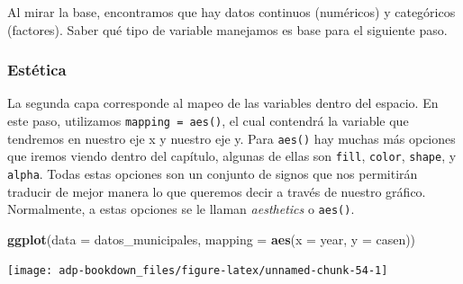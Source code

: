 \documentclass[]{book}
\newenvironment{Shaded}{\begin{snugshade}}{\end{snugshade}}
\newcommand{\CommentTok}[1]{\textcolor[rgb]{0.56,0.35,0.01}{\textit{#1}}}
\newcommand{\DataTypeTok}[1]{\textcolor[rgb]{0.13,0.29,0.53}{#1}}
\newcommand{\KeywordTok}[1]{\textcolor[rgb]{0.13,0.29,0.53}{\textbf{#1}}}
\newcommand{\NormalTok}[1]{#1}
\begin{document}
\begin{Shaded}
\end{Shaded}

Al mirar la base, encontramos que hay datos continuos (numéricos) y
categóricos (factores). Saber qué tipo de variable manejamos es base
para el siguiente paso.

\hypertarget{estetica}{%
\subsubsection{Estética}\label{estetica}}

La segunda capa corresponde al mapeo de las variables dentro del
espacio. En este paso, utilizamos \texttt{mapping\ =\ aes()}, el cual
contendrá la variable que tendremos en nuestro eje x y nuestro eje y.
Para \texttt{aes()} hay muchas más opciones que iremos viendo dentro del
capítulo, algunas de ellas son \texttt{fill}, \texttt{color},
\texttt{shape}, y \texttt{alpha}. Todas estas opciones son un conjunto
de signos que nos permitirán traducir de mejor manera lo que queremos
decir a través de nuestro gráfico. Normalmente, a estas opciones se le
llaman \emph{aesthetics} o \texttt{aes()}.

\begin{Shaded}
\begin{Highlighting}[]
\KeywordTok{ggplot}\NormalTok{(}\DataTypeTok{data    =}\NormalTok{ datos_municipales, }
       \DataTypeTok{mapping =} \KeywordTok{aes}\NormalTok{(}\DataTypeTok{x =}\NormalTok{ year, }\DataTypeTok{y =}\NormalTok{ casen))}
\end{Highlighting}
\end{Shaded}

\begin{center}\texttt{[image: adp-bookdown\_files/figure-latex/unnamed-chunk-54-1]} \end{center}
\end{document}
